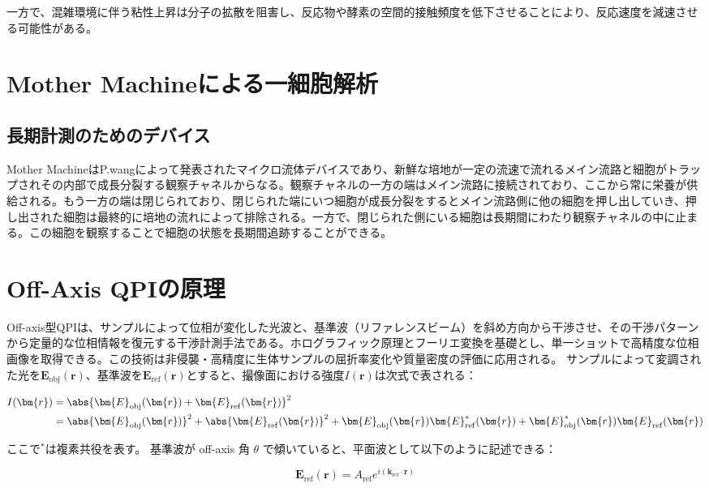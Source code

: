 一方で、混雑環境に伴う粘性上昇は分子の拡散を阻害し、反応物や酵素の空間的接触頻度を低下させることにより、反応速度を減速させる可能性がある。
\section{Mother Machineによる一細胞解析}
\subsection{長期計測のためのデバイス}
Mother MachineはP.wangによって発表されたマイクロ流体デバイスであり、新鮮な培地が一定の流速で流れるメイン流路と細胞がトラップされその内部で成長分裂する観察チャネルからなる。観察チャネルの一方の端はメイン流路に接続されており、ここから常に栄養が供給される。もう一方の端は閉じられており、閉じられた端にいつ細胞が成長分裂をするとメイン流路側に他の細胞を押し出していき、押し出された細胞は最終的に培地の流れによって排除される。一方で、閉じられた側にいる細胞は長期間にわたり観察チャネルの中に止まる。この細胞を観察することで細胞の状態を長期間追跡することができる。
\section{Off-Axis QPIの原理}
Off-axis型QPIは、サンプルによって位相が変化した光波と、基準波（リファレンスビーム）を斜め方向から干渉させ、その干渉パターンから定量的な位相情報を復元する干渉計測手法である。ホログラフィック原理とフーリエ変換を基礎とし、単一ショットで高精度な位相画像を取得できる。この技術は非侵襲・高精度に生体サンプルの屈折率変化や質量密度の評価に応用される。
サンプルによって変調された光を$\bm{E}_{\mathrm{obj}}(\bm{r})$、基準波を$\bm{E}_{\mathrm{ref}}(\bm{r})$とすると、撮像面における強度$I(\bm{r})$は次式で表される：

\begin{align}
I(\bm{r}) &= \abs{\bm{E}_{\mathrm{obj}}(\bm{r}) + \bm{E}_{\mathrm{ref}}(\bm{r})}^2 \\
&= \abs{\bm{E}_{\mathrm{obj}}(\bm{r})}^2 + \abs{\bm{E}_{\mathrm{ref}}(\bm{r})}^2 + \bm{E}_{\mathrm{obj}}(\bm{r}) \bm{E}_{\mathrm{ref}}^*(\bm{r}) + \bm{E}_{\mathrm{obj}}^*(\bm{r}) \bm{E}_{\mathrm{ref}}(\bm{r})
\end{align}

ここで$^*$は複素共役を表す。
基準波が off-axis 角 $\theta$ で傾いていると、平面波として以下のように記述できる：

\begin{equation}
\bm{E}_{\mathrm{ref}}(\bm{r}) = A_{\mathrm{ref}} e^{i (\bm{k}_{\mathrm{ref}} \cdot \bm{r})}
\end{equation}

